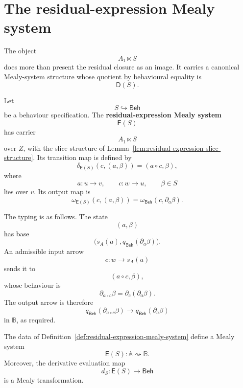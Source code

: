 \section{The residual-expression Mealy system}
\label{sec:residual-expression-mealy-system}

The object
\[
A_1\ltimes S
\]
does more than present the residual closure as an image. It carries a canonical
Mealy-system structure whose quotient by behavioural equality is
\[
\mathsf D(S).
\]

\begin{definition}
\label{def:residual-expression-mealy-system}
Let
\[
S\hookrightarrow\mathsf{Beh}
\]
be a behaviour specification. The \textbf{residual-expression Mealy system}
\[
\mathsf E(S)
\]
has carrier
\[
A_1\ltimes S
\]
over \(Z\), with the slice structure of
Lemma~\ref{lem:residual-expression-slice-structure}. Its transition map is
defined by
\[
\delta_{\mathsf E(S)}(c,(a,\beta))
=
(a\circ c,\beta),
\]
where
\[
a:u\to v,
\qquad
c:w\to u,
\qquad
\beta\in S
\]
lies over \(v\). Its output map is
\[
\omega_{\mathsf E(S)}(c,(a,\beta))
=
\omega_{\mathsf{Beh}}(c,\partial_a\beta).
\]
\end{definition}

The typing is as follows. The state
\[
(a,\beta)
\]
has base
\[
\bigl(s_A(a),q_{\mathsf{Beh}}(\partial_a\beta)\bigr).
\]
An admissible input arrow
\[
c:w\to s_A(a)
\]
sends it to
\[
(a\circ c,\beta),
\]
whose behaviour is
\[
\partial_{a\circ c}\beta
=
\partial_c(\partial_a\beta).
\]
The output arrow is therefore
\[
q_{\mathsf{Beh}}(\partial_{a\circ c}\beta)
\to
q_{\mathsf{Beh}}(\partial_a\beta)
\]
in \(\mathbb B\), as required.

\begin{proposition}
\label{prop:residual-expression-is-mealy}
The data of Definition~\ref{def:residual-expression-mealy-system} define a
Mealy system
\[
\mathsf E(S):\mathbb A\rightsquigarrow\mathbb B.
\]
Moreover, the derivative evaluation map
\[
d_S:\mathsf E(S)\to\mathsf{Beh}
\]
is a Mealy transformation.
\end{proposition}

